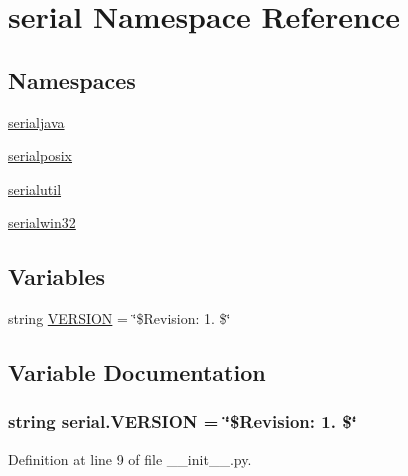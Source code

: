 \hypertarget{namespaceserial}{}\section{serial Namespace Reference}
\label{namespaceserial}
\subsection*{Namespaces}
\begin{DoxyCompactItemize}
\item 
 \hyperlink{namespaceserial_1_1serialjava}{serialjava}
\item 
 \hyperlink{namespaceserial_1_1serialposix}{serialposix}
\item 
 \hyperlink{namespaceserial_1_1serialutil}{serialutil}
\item 
 \hyperlink{namespaceserial_1_1serialwin32}{serialwin32}
\end{DoxyCompactItemize}
\subsection*{Variables}
\begin{DoxyCompactItemize}
\item 
string \hyperlink{namespaceserial_ab1ad9923950555c24582ac2734b3bd84}{V\+E\+R\+S\+I\+ON} = \char`\"{}\$Revision\+: 1. \$\char`\"{}
\end{DoxyCompactItemize}


\subsection{Variable Documentation}
\subsubsection[{\texorpdfstring{V\+E\+R\+S\+I\+ON}{VERSION}}]{\setlength{\rightskip}{0pt plus 5cm}string serial.\+V\+E\+R\+S\+I\+ON = \char`\"{}\$Revision\+: 1. \$\char`\"{}}\hypertarget{namespaceserial_ab1ad9923950555c24582ac2734b3bd84}{}\label{namespaceserial_ab1ad9923950555c24582ac2734b3bd84}


Definition at line 9 of file \+\_\+\+\_\+init\+\_\+\+\_\+.\+py.

